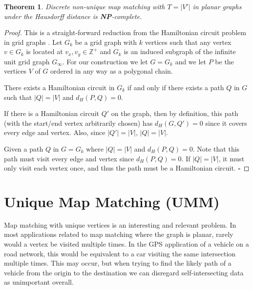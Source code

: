 \documentclass{article}[11pt]
\newcommand{\dhaus}{d_H}
\newcommand{\npc}{\textbf{NP}-complete}
\newtheorem{theorem}{Theorem}
\begin{document}
\begin{theorem} \label{thm:nmmskhaus}
    Discrete non-unique map matching with $T=|V'|$ in planar graphs under the Hausdorff distance is \npc .
\end{theorem}



\begin{proof}
    This is a straight-forward reduction from the Hamiltonian circuit problem in grid graphs \cite{Itai:1982:SIAM}.
    Let $G_{k}$ be a grid graph with $k$ vertices such that any vertex $v \in G_k$ is located at 
    $v_x,v_y \in \mathbb{Z}^+$ and $G_{k}$ is an induced 
    subgraph of the infinite unit grid graph $G_{\infty}$.
    For our construction we let $G = G_{k}$ and we let $P$ be the vertices $V$ of $G$ ordered in any way as
    a polygonal chain.
    
    There exists a Hamiltonian circuit in $G_{k}$ if and only if 
    there exists a path $Q$ in $G$ such that $|Q|=|V|$ and $\dhaus(P,Q) = 0$. 
    
    
    If there is a Hamiltonian circuit $Q'$ on the graph, then by definition, this path 
    (with the start/end vertex arbitrarily chosen) has $\dhaus(G,Q') = 0$
    since it covers every edge and vertex.  Also, since $|Q'|=|V|$, $|Q|=|V|$. 
    
    Given a path $Q$ in $G=G_{k}$ where $|Q|=|V|$ and $\dhaus(P,Q) = 0$. Note that
    this path must visit every edge and vertex since $\dhaus(P,Q) = 0$.  If $|Q|=|V|$,
    it must only visit each vertex once, and thus the path must be a Hamiltonian
    circuit.
    \hfill $\square$
\end{proof}








\section{Unique Map Matching (UMM)} \label{sec:ummk}



Map matching with unique vertices is an interesting and relevant problem.
In most applications related to map matching where the graph is 
planar, rarely would a vertex be visited multiple times.  In the 
GPS application of a vehicle on a road network, this would be equivalent to a car 
visiting the same intersection multiple times.  This may occur, but when trying to 
find the likely path of a vehicle from the origin to the destination we can
disregard self-intersecting data as unimportant overall.  
\end{document}
